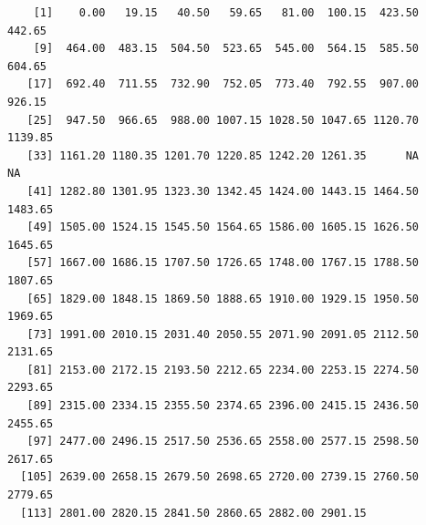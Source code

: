 \documentclass[12pt,twoside]{reedthesis}
\begin{document}
  \begin{verbatim}
    [1]    0.00   19.15   40.50   59.65   81.00  100.15  423.50  442.65
    [9]  464.00  483.15  504.50  523.65  545.00  564.15  585.50  604.65
   [17]  692.40  711.55  732.90  752.05  773.40  792.55  907.00  926.15
   [25]  947.50  966.65  988.00 1007.15 1028.50 1047.65 1120.70 1139.85
   [33] 1161.20 1180.35 1201.70 1220.85 1242.20 1261.35      NA      NA
   [41] 1282.80 1301.95 1323.30 1342.45 1424.00 1443.15 1464.50 1483.65
   [49] 1505.00 1524.15 1545.50 1564.65 1586.00 1605.15 1626.50 1645.65
   [57] 1667.00 1686.15 1707.50 1726.65 1748.00 1767.15 1788.50 1807.65
   [65] 1829.00 1848.15 1869.50 1888.65 1910.00 1929.15 1950.50 1969.65
   [73] 1991.00 2010.15 2031.40 2050.55 2071.90 2091.05 2112.50 2131.65
   [81] 2153.00 2172.15 2193.50 2212.65 2234.00 2253.15 2274.50 2293.65
   [89] 2315.00 2334.15 2355.50 2374.65 2396.00 2415.15 2436.50 2455.65
   [97] 2477.00 2496.15 2517.50 2536.65 2558.00 2577.15 2598.50 2617.65
  [105] 2639.00 2658.15 2679.50 2698.65 2720.00 2739.15 2760.50 2779.65
  [113] 2801.00 2820.15 2841.50 2860.65 2882.00 2901.15
  \end{verbatim}
  
  \begin{Shaded}
  \begin{Highlighting}[]
  \NormalTok{tablePRO<-tablePRO[}\NormalTok{(}\NormalTok{, }\NormalTok{(tablePRO))]}
  
  \StringTok{ }\NormalTok{)}
  
  \NormalTok{,}\NormalTok{, }\NormalTok{,}\NormalTok{)}
  \NormalTok{(} \NormalTok{)}
  \NormalTok{(}\NormalTok{, } \NormalTok{(} \NormalTok{(}\NormalTok{,}\NormalTok{)}
  \end{Highlighting}
  \end{Shaded}
  
\end{document}

